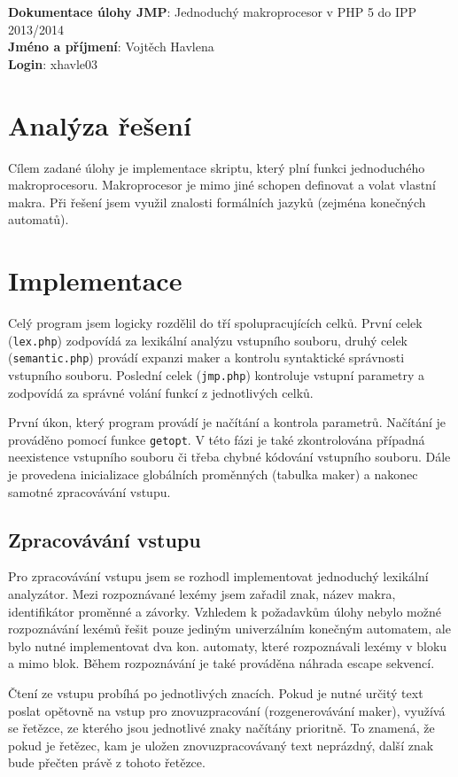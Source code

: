 \documentclass[a4paper,10pt]{article}
\begin{document}
\noindent
\textbf{Dokumentace úlohy JMP}: Jednoduchý makroprocesor v PHP 5 do IPP 2013/2014\\
\textbf{Jméno a příjmení}: Vojtěch Havlena\\
\textbf{Login}: xhavle03

\section{Analýza řešení}
Cílem zadané úlohy je implementace skriptu, který plní funkci jednoduchého makroprocesoru.
Makroprocesor je mimo jiné schopen definovat a volat vlastní makra. Při řešení jsem 
využil znalosti formálních jazyků (zejména konečných automatů).

\section{Implementace}
Celý program jsem logicky rozdělil do tří spolupracujících celků. První celek (\texttt{lex.php})
zodpovídá za lexikální analýzu vstupního souboru, druhý celek (\texttt{semantic.php}) provádí expanzi maker
a kontrolu syntaktické správnosti vstupního souboru. Poslední celek (\texttt{jmp.php}) kontroluje vstupní
parametry a zodpovídá za správné volání funkcí z jednotlivých celků.

První úkon, který program provádí je načítání a kontrola parametrů. Načítání je prováděno pomocí 
funkce \texttt{getopt}. V této fázi je také zkontrolována případná neexistence 
vstupního souboru či třeba chybné kódování vstupního souboru. Dále je provedena inicializace
globálních proměnných (tabulka maker) a nakonec samotné zpracovávání vstupu.

\subsection{Zpracovávání vstupu}
Pro zpracovávání vstupu jsem se rozhodl implementovat jednoduchý lexikální analyzátor.
Mezi rozpoznávané lexémy jsem zařadil znak, název makra, identifikátor proměnné a 
závorky. Vzhledem k požadavkům úlohy nebylo možné rozpoznávání lexémů řešit pouze jediným
univerzálním konečným automatem, ale bylo nutné implementovat dva kon. automaty, které 
rozpoznávali lexémy v bloku a mimo blok. Během rozpoznávání je také prováděna náhrada
escape sekvencí. 

Čtení ze vstupu probíhá po jednotlivých znacích. Pokud je nutné 
určitý text poslat opětovně na vstup pro znovuzpracování (rozgenerovávání maker),
využívá se řetězce, ze kterého jsou jednotlivé znaky načítány prioritně. To znamená, že
pokud je řetězec, kam je uložen znovuzpracovávaný text neprázdný, další znak bude 
přečten právě z tohoto řetězce.
\end{document}
